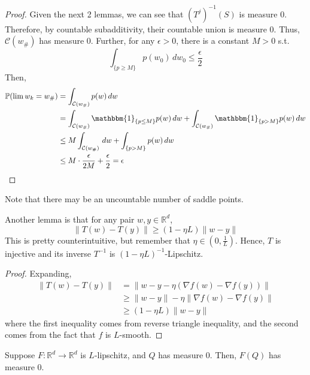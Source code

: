 \begin{proof}
		Given the next 2 lemmas, we can see that $(T^j)^{-1}(S)$ is measure $0$. Therefore, by countable subadditivity, their countable union is measure $0$. Thus, $\mathcal{C}(w_{\#})$ has measure $0$. Further, for any $\epsilon > 0$, there is a constant $M > 0$ s.t. 
		\begin{equation}
			\int_{\{p \geq M\}} p(w_0) \,dw_0 \leq \frac{\epsilon}{2}
		\end{equation}
		Then, 
		\begin{align}
			\mathbb{P}(\lim w_k = w_{\#}) 
				& = \int_{\mathcal{C}(w_{\#})} p(w) \,dw \\ 
				& = \int_{\mathcal{C}(w_{\#})} \mathbbm{1}_{\{p \leq M\}} p(w) \,dw + \int_{\mathcal{C}(w_{\#})} \mathbbm{1}_{\{p > M\}} p(w) \,dw \\ 
				& \leq M \int_{\mathcal{C}(w_{\#})} \,dw + \int_{\{p > M \}} p(w) \,dw \\ 
				& \leq M \cdot \frac{\epsilon}{2M} + \frac{\epsilon}{2} = \epsilon
		\end{align}
	\end{proof}

	Note that there may be an uncountable number of saddle points. 

	\begin{lemma}
	  \label{thm:a-three-point-identity-for-smooth-functions}
 
		Another lemma is that for any pair $w, y \in \mathbb{R}^d$, 
		\begin{equation}
		  \| T(w) - T(y)\| \geq (1 - \eta L) \| w - y\|
		\end{equation}
		This is pretty counterintuitive, but remember that $\eta \in (0, \frac{1}{L})$. Hence, $T$ is injective and its inverse $T^{-1}$ is $(1 - \eta L)^{-1}$-Lipschitz. 
	\end{lemma}
	\begin{proof}
	  Expanding, 
		\begin{align}
			\|T(w) - T(y) \| & = \|w - y - \eta (\nabla f(w) - \nabla f(y))\| \\ 
											 & \geq \|w - y\| - \eta \|\nabla f(w) - \nabla f(y)\| \\ 
											 & \geq (1 - \eta L) \|w - y\|
		\end{align}
		where the first inequality comes from reverse triangle inequality, and the second comes from the fact that $f$ is $L$-smooth. 
	\end{proof}

	\begin{lemma}
	  \label{thm:lipschitz-maps-preserve-null-sets}
 
		Suppose $F: \mathbb{R}^d \to \mathbb{R}^d$ is $L$-lipschitz, and $Q$ has measure $0$. Then, $F(Q)$ has measure $0$. 
	\end{lemma}

